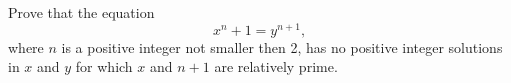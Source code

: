 Prove that the equation \[ x^n + 1 = y^{n+1}, \] where $n$ is a positive integer not smaller then 2, has no positive integer solutions in $x$ and $y$ for which $x$ and $n+1$ are relatively prime.